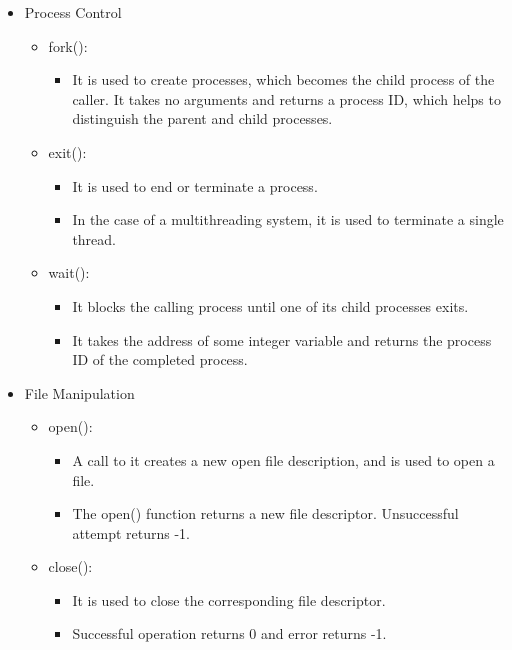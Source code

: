 \begin{itemize}
    \item Process Control
        \begin{itemize}
            \item fork():
                \begin{itemize}
                    \item It is used to create processes, which becomes the child process of the caller. It takes no arguments and returns a process ID, which helps to distinguish the parent and child processes.
                \end{itemize}
            \item exit():
                \begin{itemize}
                    \item It is used to end or terminate a process.
                    \item In the case of a multithreading system, it is used to terminate a single thread.
                \end{itemize}
            \item wait():
                \begin{itemize}
                    \item It blocks the calling process until one of its child processes exits.
                    \item It takes the address of some integer variable and returns the process ID of the completed process.
                \end{itemize}
        \end{itemize}
    \item File Manipulation
        \begin{itemize}
            \item open():
                \begin{itemize}
                    \item A call to it creates a new open file description, and is used to open a file.
                    \item The open() function returns a new file descriptor. Unsuccessful attempt returns -1.
                \end{itemize}
            \item close():
                \begin{itemize}
                    \item It is used to close the corresponding file descriptor.
                    \item Successful operation returns 0 and error returns -1.

\end{itemize}
\end{itemize}
\end{itemize}
